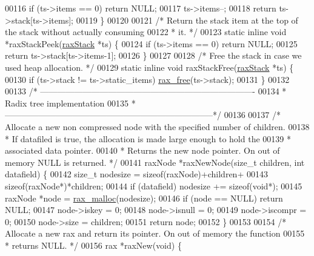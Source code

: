 \begin{DoxyCode}
{00116     \textcolor{keywordflow}{if} (ts->items == 0) \textcolor{keywordflow}{return} NULL;
00117     ts->items--;
00118     \textcolor{keywordflow}{return} ts->stack[ts->items];
00119 \}
00120 
00121 \textcolor{comment}{/* Return the stack item at the top of the stack without actually consuming}
00122 \textcolor{comment}{ * it. */}
00123 \textcolor{keyword}{static} \textcolor{keyword}{inline} \textcolor{keywordtype}{void} *raxStackPeek(\hyperlink{structraxStack}{raxStack} *ts) \{
00124     \textcolor{keywordflow}{if} (ts->items == 0) \textcolor{keywordflow}{return} NULL;
00125     \textcolor{keywordflow}{return} ts->stack[ts->items-1];
00126 \}
00127 
00128 \textcolor{comment}{/* Free the stack in case we used heap allocation. */}
00129 \textcolor{keyword}{static} \textcolor{keyword}{inline} \textcolor{keywordtype}{void} raxStackFree(\hyperlink{structraxStack}{raxStack} *ts) \{
00130     \textcolor{keywordflow}{if} (ts->stack != ts->static\_items) \hyperlink{rax__malloc_8h_a3adfa16bca6cd23b6e125fd441465e49}{rax\_free}(ts->stack);
00131 \}
00132 
00133 \textcolor{comment}{/* ----------------------------------------------------------------------------}
00134 \textcolor{comment}{ * Radix tree implementation}
00135 \textcolor{comment}{ * --------------------------------------------------------------------------*/}
00136 
00137 \textcolor{comment}{/* Allocate a new non compressed node with the specified number of children.}
00138 \textcolor{comment}{ * If datafiled is true, the allocation is made large enough to hold the}
00139 \textcolor{comment}{ * associated data pointer.}
00140 \textcolor{comment}{ * Returns the new node pointer. On out of memory NULL is returned. */}
00141 raxNode *raxNewNode(size\_t children, \textcolor{keywordtype}{int} datafield) \{
00142     size\_t nodesize = \textcolor{keyword}{sizeof}(raxNode)+children+
00143                       \textcolor{keyword}{sizeof}(raxNode*)*children;
00144     \textcolor{keywordflow}{if} (datafield) nodesize += \textcolor{keyword}{sizeof}(\textcolor{keywordtype}{void}*);
00145     raxNode *node = \hyperlink{rax__malloc_8h_aba4b5d6a50f54903fe9c330308beb66a}{rax\_malloc}(nodesize);
00146     \textcolor{keywordflow}{if} (node == NULL) \textcolor{keywordflow}{return} NULL;
00147     node->iskey = 0;
00148     node->isnull = 0;
00149     node->iscompr = 0;
00150     node->size = children;
00151     \textcolor{keywordflow}{return} node;
00152 \}
00153 
00154 \textcolor{comment}{/* Allocate a new rax and return its pointer. On out of memory the function}
00155 \textcolor{comment}{ * returns NULL. */}
00156 rax *raxNew(\textcolor{keywordtype}{void}) \{
}
\end{DoxyCode}
